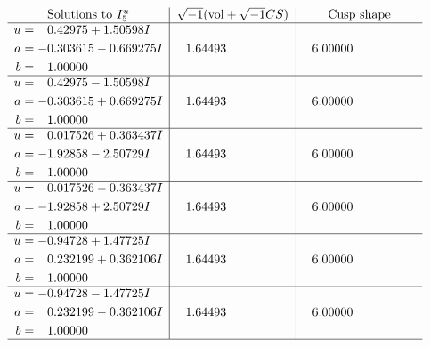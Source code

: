 \documentclass[1p]{elsarticle_modified}
\theoremstyle{definition}
\newcommand{\I}{\sqrt{-1}}
\begin{document}
$$\begin{array}{c|c|c}  
\text{Solutions to }I^u_{5}& \I (\text{vol} + \sqrt{-1}CS) & \text{Cusp shape}\\
 \hline 
\begin{aligned}
u &= \phantom{-}0.42975 + 1.50598 I \\
a &= -0.303615 - 0.669275 I \\
b &= \phantom{-}1.00000\phantom{ +0.000000I}\end{aligned}
 & \phantom{-}1.64493\phantom{ +0.000000I} & \phantom{-}6.00000\phantom{ +0.000000I} \\ \hline\begin{aligned}
u &= \phantom{-}0.42975 - 1.50598 I \\
a &= -0.303615 + 0.669275 I \\
b &= \phantom{-}1.00000\phantom{ +0.000000I}\end{aligned}
 & \phantom{-}1.64493\phantom{ +0.000000I} & \phantom{-}6.00000\phantom{ +0.000000I} \\ \hline\begin{aligned}
u &= \phantom{-}0.017526 + 0.363437 I \\
a &= -1.92858 - 2.50729 I \\
b &= \phantom{-}1.00000\phantom{ +0.000000I}\end{aligned}
 & \phantom{-}1.64493\phantom{ +0.000000I} & \phantom{-}6.00000\phantom{ +0.000000I} \\ \hline\begin{aligned}
u &= \phantom{-}0.017526 - 0.363437 I \\
a &= -1.92858 + 2.50729 I \\
b &= \phantom{-}1.00000\phantom{ +0.000000I}\end{aligned}
 & \phantom{-}1.64493\phantom{ +0.000000I} & \phantom{-}6.00000\phantom{ +0.000000I} \\ \hline\begin{aligned}
u &= -0.94728 + 1.47725 I \\
a &= \phantom{-}0.232199 + 0.362106 I \\
b &= \phantom{-}1.00000\phantom{ +0.000000I}\end{aligned}
 & \phantom{-}1.64493\phantom{ +0.000000I} & \phantom{-}6.00000\phantom{ +0.000000I} \\ \hline\begin{aligned}
u &= -0.94728 - 1.47725 I \\
a &= \phantom{-}0.232199 - 0.362106 I \\
b &= \phantom{-}1.00000\phantom{ +0.000000I}\end{aligned}
 & \phantom{-}1.64493\phantom{ +0.000000I} & \phantom{-}6.00000\phantom{ +0.000000I}\\
 \hline 
 \end{array}$$\newpage\newpage\renewcommand{\arraystretch}{1}
\end{document}

